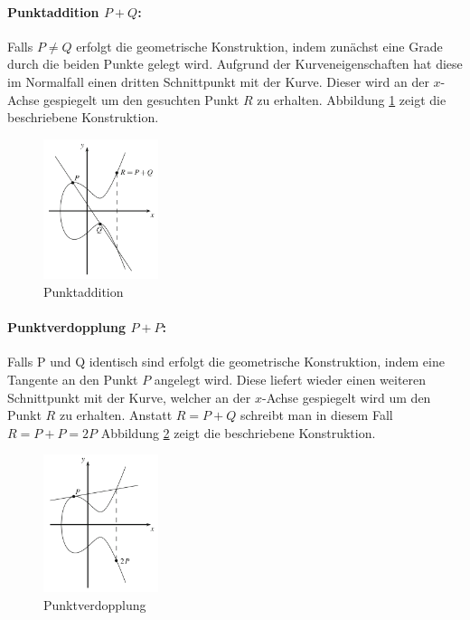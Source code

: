\paragraph{Punktaddition $P + Q$:}
Falls $P \neq Q$ erfolgt die geometrische Konstruktion, indem zunächst eine Grade durch die beiden Punkte gelegt wird. Aufgrund der Kurveneigenschaften hat diese im Normalfall einen dritten Schnittpunkt mit der Kurve. Dieser wird an der $x$-Achse gespiegelt um den gesuchten Punkt $R$ zu erhalten. Abbildung \ref{fig:Punktaddition} zeigt die beschriebene Konstruktion.

\begin{figure}[H]
    \centering
    \includegraphics[width=0.3\textwidth]{grafiken/Punktaddition.PNG}
    \caption{Punktaddition}
    \label{fig:Punktaddition}
\end{figure}

\paragraph{Punktverdopplung $P + P$:}
Falls P und Q identisch sind erfolgt die geometrische Konstruktion, indem eine Tangente an den Punkt $P$ angelegt wird. Diese liefert wieder einen weiteren Schnittpunkt mit der Kurve, welcher an der $x$-Achse gespiegelt wird um den Punkt $R$ zu erhalten. Anstatt $R = P + Q$ schreibt man in diesem Fall $R = P + P = 2P$   Abbildung \ref{fig:Punktverdopplung} zeigt die beschriebene Konstruktion. 

\begin{figure}[H]
    \centering
    \includegraphics[width=0.3\textwidth]{grafiken/Punktverdopplung.PNG}
    \caption{Punktverdopplung}
    \label{fig:Punktverdopplung}
\end{figure}

